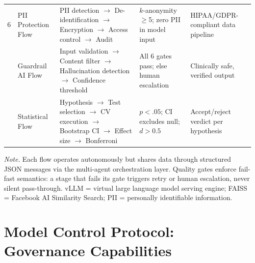 {\begin{xltabular}{\textwidth}{@{} p{0.6cm} p{1.8cm} L p{2.8cm} L @{}}
6 & PII Protection Flow & PII detection $\to$ De-identification $\to$ Encryption $\to$ Access control $\to$ Audit & $k$-anonymity $\geq$5; zero PII in model input & HIPAA/GDPR-compliant data pipeline \\
 & Guardrail AI Flow & Input validation $\to$ Content filter $\to$ Hallucination detection $\to$ Confidence threshold & All 6 gates pass; else human escalation & Clinically safe, verified output \\
 & Statistical Flow & Hypothesis $\to$ Test selection $\to$ CV execution $\to$ Bootstrap CI $\to$ Effect size $\to$ Bonferroni & $p < .05$; CI excludes null; $d > 0.5$ & Accept/reject verdict per hypothesis \\
\end{xltabular}}
\vspace{0.5em}\noindent\textit{Note.} Each flow operates autonomously but shares data through structured JSON messages via the multi-agent orchestration layer. Quality gates enforce fail-fast semantics: a stage that fails its gate triggers retry or human escalation, never silent pass-through. vLLM = virtual large language model serving engine; FAISS = Facebook AI Similarity Search; PII = personally identifiable information.


\section{Model Control Protocol: Governance Capabilities}
\label{sec:appx_mcp}

